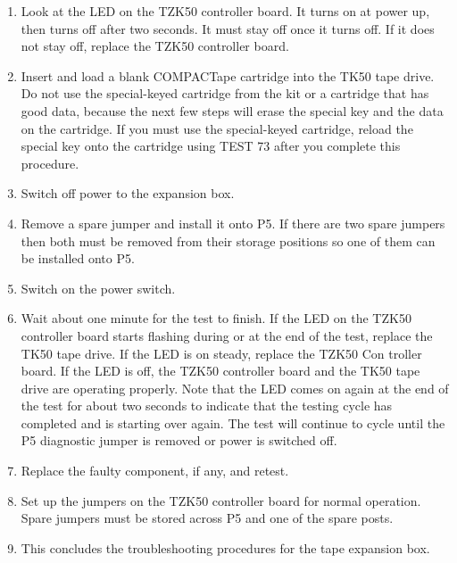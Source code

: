 \begin{enumerate}
\item	Look at the LED on the TZK50 controller board. It turns on at power
		up, then turns off after two seconds. It must stay off once it turns off.
		If it does not stay off, replace the TZK50 controller board.

\item	Insert and load a blank COMPACTape cartridge into the TK50 tape
		drive. Do not use the special-keyed cartridge from the kit or a cartridge
		that has good data, because the next few steps will erase the special
		key and the data on the cartridge. If you must use the special-keyed
		cartridge, reload the special key onto the cartridge using TEST 73 after
		you complete this procedure.

\item	Switch off power to the expansion box.

\item	Remove a spare jumper and install it onto P5. If there are two spare
		jumpers then both must be removed from their storage positions so one
		of them can be installed onto P5.

\item	Switch on the power switch.

\item	Wait about one minute for the test to finish. If the LED on the TZK50
		controller board starts flashing during or at the end of the test, replace
		the TK50 tape drive. If the LED is on steady, replace the TZK50 Con
		troller board. If the LED is off, the TZK50 controller board and the TK50
		tape drive are operating properly. Note that the LED comes on again
		at the end of the test for about two seconds to indicate that the testing
		cycle has completed and is starting over again. The test will continue
		to cycle until the P5 diagnostic jumper is removed or power is switched
		off.

\newpage
{}
\newpage

\item	Replace the faulty component, if any, and retest.

\item	Set up the jumpers on the TZK50 controller board for normal operation.
		Spare jumpers must be stored across P5 and one of the spare posts.

\item	This concludes the troubleshooting procedures for the tape expansion
		box.

\end{enumerate}

